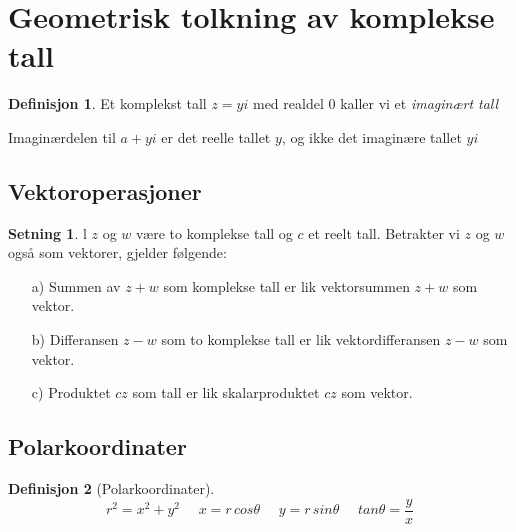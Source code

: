\documentclass[11pt]{article}
\theoremstyle{definition}
\newtheorem{mindef}{Definisjon}[section]
\newenvironment{fmindef}
{\begin{mdframed}[style=minstil]\begin{mindef}}
		{\end{mindef}\end{mdframed}}
\theoremstyle{definition}
\theoremstyle{definition}
\newtheorem{minset}{Setning}[section]
\newenvironment{fminset}
{\begin{mdframed}[style=minstil]\begin{minset}}
		{\end{minset}\end{mdframed}}
\theoremstyle{definition}
\theoremstyle{definition}
\theoremstyle{definition}
\begin{document}
	\newpage
	
	\section{Geometrisk tolkning av komplekse tall}
	
	\begin{fmindef}
		Et komplekst tall \(z=yi\) med realdel \(0\) kaller vi et \textit{imaginært tall}
		
		Imaginærdelen til \(a+yi\) er det reelle tallet \(y\), og ikke det imaginære tallet \(yi\)
	\end{fmindef}
	
	\subsection{Vektoroperasjoner}
	
	\begin{fminset}
		l \(z\) og \(w\) være to komplekse tall og \(c\) et reelt tall. Betrakter vi \(z\) og \(w\) også som vektorer, gjelder følgende:
		\begin{enumerate}
			\item[a)] Summen av \(z+w\) som komplekse tall er lik vektorsummen \(z+w\) som vektor.
			\item[b)] Differansen \(z-w\) som to komplekse tall er lik vektordifferansen \(z-w\) som vektor.
			\item[c)] Produktet \(cz\) som tall er lik skalarproduktet \(cz\) som vektor.
		\end{enumerate}
	\end{fminset}
	
	\newpage
	
	\subsection{Polarkoordinater}
	
	\begin{fmindef}[Polarkoordinater]
		\[r^2=x^2+y^2 \hspace{16pt} x=r\, cos\theta \hspace{16pt} y=r\, sin\theta \hspace{16pt} tan\theta =\dfrac{y}{x} \]
	\end{fmindef}
	
\end{document}
